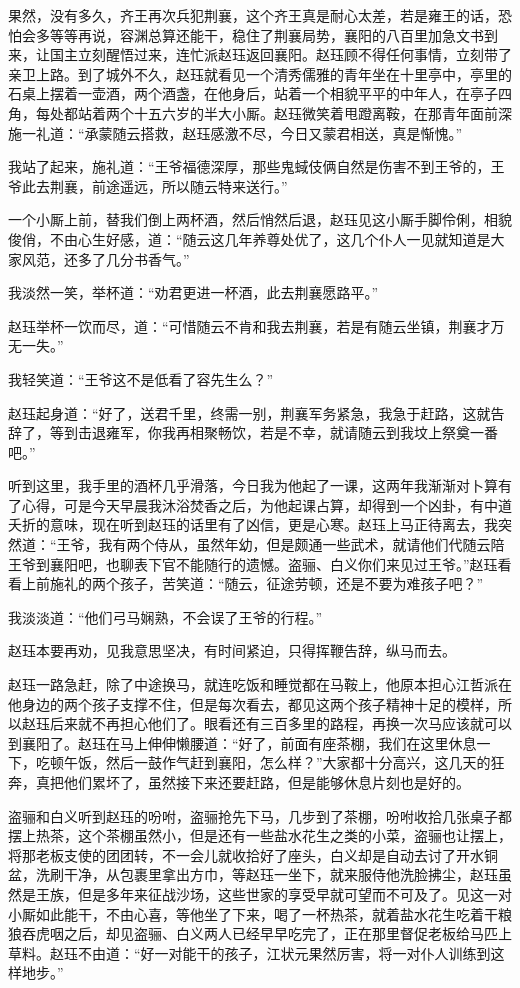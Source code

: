 果然，没有多久，齐王再次兵犯荆襄，这个齐王真是耐心太差，若是雍王的话，恐怕会多等等再说，容渊总算还能干，稳住了荆襄局势，襄阳的八百里加急文书到来，让国主立刻醒悟过来，连忙派赵珏返回襄阳。赵珏顾不得任何事情，立刻带了亲卫上路。到了城外不久，赵珏就看见一个清秀儒雅的青年坐在十里亭中，亭里的石桌上摆着一壶酒，两个酒盏，在他身后，站着一个相貌平平的中年人，在亭子四角，每处都站着两个十五六岁的半大小厮。赵珏微笑着甩蹬离鞍，在那青年面前深施一礼道：“承蒙随云搭救，赵珏感激不尽，今日又蒙君相送，真是惭愧。”

我站了起来，施礼道：“王爷福德深厚，那些鬼蜮伎俩自然是伤害不到王爷的，王爷此去荆襄，前途遥远，所以随云特来送行。”

一个小厮上前，替我们倒上两杯酒，然后悄然后退，赵珏见这小厮手脚伶俐，相貌俊俏，不由心生好感，道：“随云这几年养尊处优了，这几个仆人一见就知道是大家风范，还多了几分书香气。”

我淡然一笑，举杯道：“劝君更进一杯酒，此去荆襄愿路平。”

赵珏举杯一饮而尽，道：“可惜随云不肯和我去荆襄，若是有随云坐镇，荆襄才万无一失。”

我轻笑道：“王爷这不是低看了容先生么？”

赵珏起身道：“好了，送君千里，终需一别，荆襄军务紧急，我急于赶路，这就告辞了，等到击退雍军，你我再相聚畅饮，若是不幸，就请随云到我坟上祭奠一番吧。”

听到这里，我手里的酒杯几乎滑落，今日我为他起了一课，这两年我渐渐对卜算有了心得，可是今天早晨我沐浴焚香之后，为他起课占算，却得到一个凶卦，有中道夭折的意味，现在听到赵珏的话里有了凶信，更是心寒。赵珏上马正待离去，我突然道：“王爷，我有两个侍从，虽然年幼，但是颇通一些武术，就请他们代随云陪王爷到襄阳吧，也聊表下官不能随行的遗憾。盗骊、白义你们来见过王爷。”赵珏看看上前施礼的两个孩子，苦笑道：“随云，征途劳顿，还是不要为难孩子吧？”

我淡淡道：“他们弓马娴熟，不会误了王爷的行程。”

赵珏本要再劝，见我意思坚决，有时间紧迫，只得挥鞭告辞，纵马而去。

赵珏一路急赶，除了中途换马，就连吃饭和睡觉都在马鞍上，他原本担心江哲派在他身边的两个孩子支撑不住，但是每次看去，都见这两个孩子精神十足的模样，所以赵珏后来就不再担心他们了。眼看还有三百多里的路程，再换一次马应该就可以到襄阳了。赵珏在马上伸伸懒腰道：“好了，前面有座茶棚，我们在这里休息一下，吃顿午饭，然后一鼓作气赶到襄阳，怎么样？”大家都十分高兴，这几天的狂奔，真把他们累坏了，虽然接下来还要赶路，但是能够休息片刻也是好的。

盗骊和白义听到赵珏的吩咐，盗骊抢先下马，几步到了茶棚，吩咐收拾几张桌子都摆上热茶，这个茶棚虽然小，但是还有一些盐水花生之类的小菜，盗骊也让摆上，将那老板支使的团团转，不一会儿就收拾好了座头，白义却是自动去讨了开水铜盆，洗刷干净，从包裹里拿出方巾，等赵珏一坐下，就来服侍他洗脸拂尘，赵珏虽然是王族，但是多年来征战沙场，这些世家的享受早就可望而不可及了。见这一对小厮如此能干，不由心喜，等他坐了下来，喝了一杯热茶，就着盐水花生吃着干粮狼吞虎咽之后，却见盗骊、白义两人已经早早吃完了，正在那里督促老板给马匹上草料。赵珏不由道：“好一对能干的孩子，江状元果然厉害，将一对仆人训练到这样地步。”

